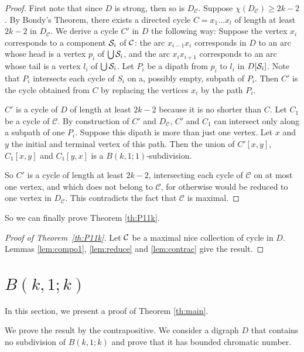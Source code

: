 \documentclass{endm}
\begin{document}
\begin{proof}
First note that since $D$ is strong, then so is $D_{\mathcal{C}}$. Suppose $\chi(D_{\mathcal{C}}) \geq 2k-2$. By Bondy's Theorem, there exists a directed cycle
$C = x_1\dots x_l$ of length at least $2k-2$ in $ D_{\mathcal{C}}$. We derive a cycle $C'$ in $D$ the following way:
Suppose the vertex $x_i$ corresponds to a component ${\cal S}_i$ of ${\cal C}$: the arc $x_{i-1}x_i$ corresponds in $D$ to an arc whose head
is a vertex $p_i$ of $\bigcup {\cal S}_i$, and the arc $x_ix_{i+1}$ corresponds to an arc whose tail is a vertex  $l_i$ of $\bigcup {\cal S}_i$. 
Let $P_i$ be a dipath 
from $p_i$ to $l_i$ in $D[{\cal S}_i]$. Note that $P_i$ intersects each cycle of $S_i$ on a, possibly empty, subpath of $P_i$. 
Then $C'$ is the cycle obtained from $C$ by replacing the vertices $x_i$ by the path $P_i$.

$C'$ is a cycle of $D$ of length at least $2k-2$ because it is no shorter than $C$. Let $C_1$ be a cycle of $\mathcal{C}$. By construction of $C'$ 
and $D_{\mathcal{C}}$, $C'$ and $C_1$ can intersect only along a subpath of one $P_i$. Suppose this dipath is more than just one vertex. Let $x$ and
$y$ the initial and terminal vertex of this path. Then the union of $C'[x,y]$,
$C_1[x,y]$ and $C_1[y,x]$ is a $B(k,1;1)$-subdivision.

So $C'$ is a cycle of length at least $2k-2$, intersecting each cycle of $\mathcal{C}$ on at most one vertex, and which does not belong to $\mathcal{C}$, for otherwise would be reduced
to one vertex in $D_{\mathcal{C}}$. This contradicts the fact that $\mathcal{C}$ is maximal.
\end{proof}

So we can finally prove Theorem \ref{th:P11k}.

\begin{proof}[Proof of Theorem~\ref{th:P11k}]
Let ${\cal C}$ be a maximal nice collection of cycle in $D$.  Lemmas \ref{lem:compo1}, \ref{lem:reduce} and \ref{lem:contrac} give the result.
\end{proof}


\section{$B(k,1;k)$}\label{sec:main}

In this section, we present a proof of Theorem \ref{th:main}.

We prove the result by the contrapositive. We consider a digraph $D$ that contains no subdivision of $B(k,1;k)$
and prove that it has bounded chromatic number.
\end{document}
